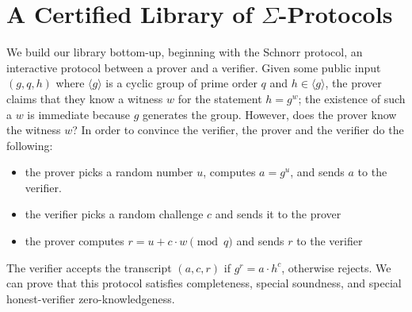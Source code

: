 \documentclass[sigconf,anonymous,review]{acmart}
\begin{document}
\section{A Certified Library of $\Sigma$-Protocols}\label{schn_proof}
  We build our library bottom-up, beginning with the Schnorr protocol, an interactive protocol 
  between a prover and a verifier. 
  Given some public input $(g, q, h)$ where $\langle g\rangle$
  is a cyclic group of prime order $q$ and $h\in\langle g\rangle$,
  the prover claims that they know a
  witness $w$ for the statement $h = g^w$; the existence of such
  a $w$ is immediate because $g$ generates the group. However,
  does the prover know the witness $w$? In order to convince the
  verifier, the prover and the verifier do the following:
  \begin{itemize}
    \item the prover picks a random number $u$, computes $a = g^u$,
    and sends $a$ to the verifier.
    \item the verifier picks a random challenge $c$ and sends it to
    the prover
    \item the prover computes $r = u + c \cdot w \pmod q$ and sends $r$ to the
    verifier
  \end{itemize}

The verifier accepts the transcript $(a, c, r)$ if $g^r = a \cdot h^c$, otherwise rejects. We can prove that 
this protocol satisfies completeness, special soundness, and special honest-verifier 
zero-knowledgeness. 
\end{document}
